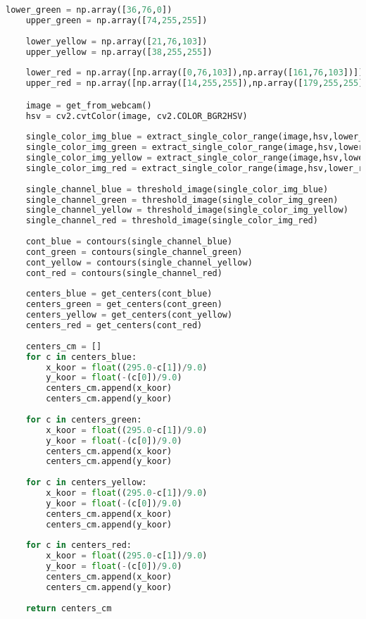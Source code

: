 \begin{lstlisting}[language=Python]
    lower_green = np.array([36,76,0])
    upper_green = np.array([74,255,255])
    
    lower_yellow = np.array([21,76,103])
    upper_yellow = np.array([38,255,255])
    
    lower_red = np.array([np.array([0,76,103]),np.array([161,76,103])])
    upper_red = np.array([np.array([14,255,255]),np.array([179,255,255])])

    image = get_from_webcam()
    hsv = cv2.cvtColor(image, cv2.COLOR_BGR2HSV)
    
    single_color_img_blue = extract_single_color_range(image,hsv,lower_blue,upper_blue)
    single_color_img_green = extract_single_color_range(image,hsv,lower_green,upper_green)
    single_color_img_yellow = extract_single_color_range(image,hsv,lower_yellow,upper_yellow)
    single_color_img_red = extract_single_color_range(image,hsv,lower_red,upper_red)
        
    single_channel_blue = threshold_image(single_color_img_blue)
    single_channel_green = threshold_image(single_color_img_green)
    single_channel_yellow = threshold_image(single_color_img_yellow)
    single_channel_red = threshold_image(single_color_img_red)
    
    cont_blue = contours(single_channel_blue)
    cont_green = contours(single_channel_green)
    cont_yellow = contours(single_channel_yellow)
    cont_red = contours(single_channel_red)
    
    centers_blue = get_centers(cont_blue)
    centers_green = get_centers(cont_green)
    centers_yellow = get_centers(cont_yellow)
    centers_red = get_centers(cont_red)
    
    centers_cm = []
    for c in centers_blue:
        x_koor = float((295.0-c[1])/9.0)
        y_koor = float(-(c[0])/9.0)
        centers_cm.append(x_koor)
        centers_cm.append(y_koor)
        
    for c in centers_green:
        x_koor = float((295.0-c[1])/9.0)
        y_koor = float(-(c[0])/9.0)
        centers_cm.append(x_koor)
        centers_cm.append(y_koor)
        
    for c in centers_yellow:
        x_koor = float((295.0-c[1])/9.0)
        y_koor = float(-(c[0])/9.0)
        centers_cm.append(x_koor)
        centers_cm.append(y_koor)
    
    for c in centers_red:
        x_koor = float((295.0-c[1])/9.0)
        y_koor = float(-(c[0])/9.0)
        centers_cm.append(x_koor)
        centers_cm.append(y_koor)
                          
    return centers_cm
\end{lstlisting}

